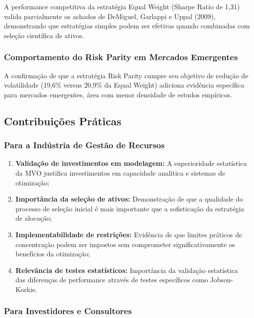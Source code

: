 A performance competitiva da estratégia Equal Weight (Sharpe Ratio de 1,31) valida parcialmente os achados de DeMiguel, Garlappi e Uppal (2009), demonstrando que estratégias simples podem ser efetivas quando combinadas com seleção científica de ativos.

\subsubsection{Comportamento do Risk Parity em Mercados Emergentes}

A confirmação de que a estratégia Risk Parity cumpre seu objetivo de redução de volatilidade (19,6\% versus 20,9\% da Equal Weight) adiciona evidência específica para mercados emergentes, área com menor densidade de estudos empíricos.

\subsection{Contribuições Práticas}

\subsubsection{Para a Indústria de Gestão de Recursos}

\begin{enumerate}
    \item \textbf{Validação de investimentos em modelagem:} A superioridade estatística da MVO justifica investimentos em capacidade analítica e sistemas de otimização;
    
    \item \textbf{Importância da seleção de ativos:} Demonstração de que a qualidade do processo de seleção inicial é mais importante que a sofisticação da estratégia de alocação;
    
    \item \textbf{Implementabilidade de restrições:} Evidência de que limites práticos de concentração podem ser impostos sem comprometer significativamente os benefícios da otimização;
    
    \item \textbf{Relevância de testes estatísticos:} Importância da validação estatística das diferenças de performance através de testes específicos como Jobson-Korkie.
\end{enumerate}

\subsubsection{Para Investidores e Consultores}

